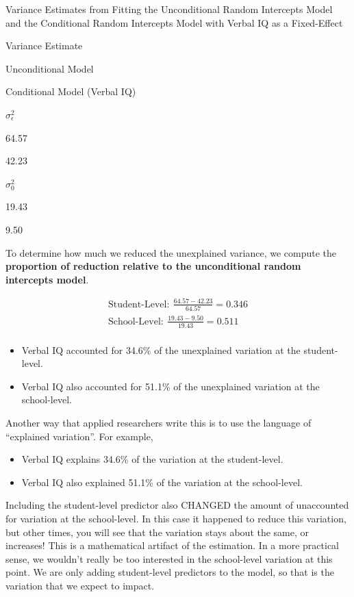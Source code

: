 \documentclass[]{book}
\providecommand{\tightlist}{%
  \setlength{\itemsep}{0pt}\setlength{\parskip}{0pt}}
\begin{document}
\label{tab:unnamed-chunk-216}Variance Estimates from Fitting the Unconditional Random Intercepts Model and the Conditional Random Intercepts Model with Verbal IQ as a Fixed-Effect

Variance Estimate

Unconditional Model

Conditional Model
(Verbal IQ)

\(\sigma^2_{\epsilon}\)

64.57

42.23

\(\sigma^2_{0}\)

19.43

9.50

To determine how much we reduced the unexplained variance, we compute the \textbf{proportion of reduction relative to the unconditional random intercepts model}.

\[
\begin{split}
\mathrm{Student\mbox{-}Level:~} \frac{64.57 - 42.23}{64.57} = 0.346 \\[1em]
\mathrm{School\mbox{-}Level:~} \frac{19.43 - 9.50}{19.43} = 0.511 \\
\end{split}
\]

\begin{itemize}
\tightlist
\item
  Verbal IQ accounted for 34.6\% of the unexplained variation at the student-level.
\item
  Verbal IQ also accounted for 51.1\% of the unexplained variation at the school-level.
\end{itemize}

Another way that applied researchers write this is to use the language of ``explained variation''. For example,

\begin{itemize}
\tightlist
\item
  Verbal IQ explains 34.6\% of the variation at the student-level.
\item
  Verbal IQ also explained 51.1\% of the variation at the school-level.
\end{itemize}

Including the student-level predictor also CHANGED the amount of unaccounted for variation at the school-level. In this case it happened to reduce this variation, but other times, you will see that the variation stays about the same, or increases! This is a mathematical artifact of the estimation. In a more practical sense, we wouldn't really be too interested in the school-level variation at this point. We are only adding student-level predictors to the model, so that is the variation that we expect to impact.
\end{document}

